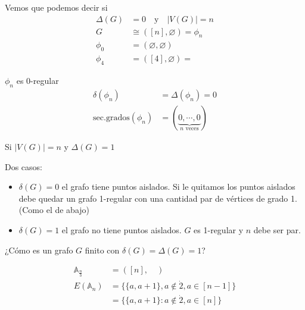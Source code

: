 \documentclass[../main.tex]{subfiles}
\begin{document}
\begin{figure}[H]
	\centering
	
\end{figure}

\begin{figure}[H]
	\centering
	
\end{figure}

Vemos que podemos decir si
\begin{align*}
	\Delta(G) &= 0\quad \text{y}\quad |V(G)|=n\\
	G&\cong([n],\varnothing)=\phi_n\\
	\phi_0 &= (\varnothing,\varnothing)\\
	\phi_4 &= ([4],\varnothing)=
\end{align*}

\begin{figure}[H]
	\centering
	
\end{figure}

$\phi_n$ es 0-regular
\begin{align*}
	\delta(\phi_n) &= \Delta(\phi_n)=0\\
	\text{sec.grados}(\phi_n)&=
	(
		\underbrace
		{
			0,\cdots,0
		}_
		{
			n\text{ veces}
		}
	)
\end{align*}

Si $|V(G)|=n$ y $\Delta(G)=1$

Dos casos:
\begin{itemize}
	\item $\delta(G)=0$ el grafo tiene puntos aislados.
		Si le quitamos los puntos aislados debe quedar un grafo 1-regular
		con una cantidad par de vértices de grado 1. (Como el de abajo)
	\item $\delta(G)=1$ el grafo no tiene puntos aislados.
		$G$ es 1-regular y $n$ debe ser par.
\end{itemize}

¿Cómo es un grafo $G$ finito con $\delta(G)=\Delta(G)=1$?

\begin{figure}[H]
	\centering
	
\end{figure}

\begin{align*}
	\mathbb{A}_\frac{n}{3} &= ([n],\quad)\\
	E(\mathbb{A}_n) &=
	\{
		\{a,a+1\},
		a \notin \dot{2},
		a\in[n-1]
	\}\\
	&=
	\{
		\{a,a+1\}:
		a\notin \dot{2},
		a \in [n]
	\}
\end{align*}
\end{document}
